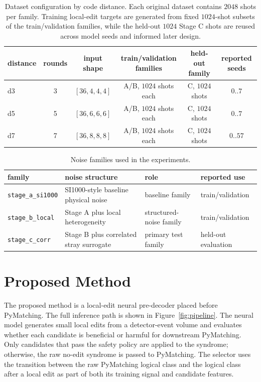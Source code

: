 \documentclass[aps,prd,12pt,twocolumn,superscriptaddress,floatfix,longbibliography]{revtex4-2}
\newcommand{\thesiscaptionfont}{\footnotesize}
\begin{document}
\begin{table}[!tbp]
\caption{\thesiscaptionfont Dataset configuration by code distance. Each original dataset contains
\(2048\) shots per family. Training local-edit targets are generated from fixed
\(1024\)-shot subsets of the train/validation families, while the held-out
\(1024\) Stage C shots are reused across model seeds and informed later design.}
\label{tab:dataset-config}
\centering
\scriptsize
\begin{tabular*}{\textwidth}{@{\extracolsep{\fill}}lccccc}
\toprule
distance & rounds & input shape & train/validation families & held-out family & reported seeds \\
\midrule
d3 & 3 & \([36,4,4,4]\) & A/B, \(1024\) shots each & C, \(1024\) shots & \(0..7\) \\
d5 & 5 & \([36,6,6,6]\) & A/B, \(1024\) shots each & C, \(1024\) shots & \(0..7\) \\
d7 & 7 & \([36,8,8,8]\) & A/B, \(1024\) shots each & C, \(1024\) shots & \(0..57\) \\
\bottomrule
\end{tabular*}
\end{table}

\begin{table}[!tbp]
\caption{\thesiscaptionfont Noise families used in the experiments.}
\label{tab:noise-family}
\centering
\footnotesize
\begin{tabular*}{\textwidth}{@{\extracolsep{\fill}}llll}
\toprule
family & noise structure & role & reported use \\
\midrule
\texttt{stage\_a\_si1000} & SI1000-style baseline physical noise & baseline family & train/validation \\
\texttt{stage\_b\_local} & Stage A plus local heterogeneity & structured-noise family & train/validation \\
\texttt{stage\_c\_corr} & Stage B plus correlated stray surrogate & primary test family & held-out evaluation \\
\bottomrule
\end{tabular*}
\end{table}

\section{Proposed Method}

The proposed method is a local-edit neural pre-decoder placed before
PyMatching. The full inference path is shown in
Figure~\ref{fig:pipeline}. The neural model generates small local edits from a
detector-event volume and evaluates whether each candidate is beneficial or
harmful for downstream PyMatching. Only candidates that pass the safety policy
are applied to the syndrome; otherwise, the raw no-edit syndrome is passed to
PyMatching.
The selector uses the transition between the raw PyMatching logical class and
the logical class after a local edit as part of both its training signal and
candidate features.
\end{document}
